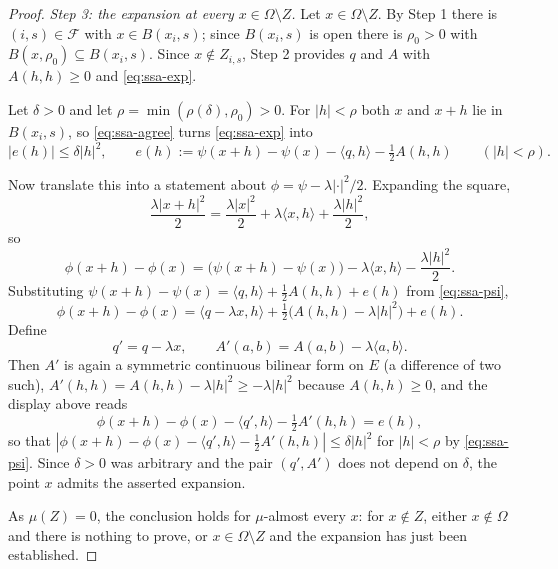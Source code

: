 \begin{proof}
\emph{Step 3: the expansion at every $x\in\Omega\setminus Z$.}
Let $x\in\Omega\setminus Z$. By Step 1 there is $(i,s)\in\mathcal F$ with
$x\in B(x_i,s)$; since $B(x_i,s)$ is open there is $\rho_0>0$ with
$B(x,\rho_0)\subseteq B(x_i,s)$. Since $x\notin Z_{i,s}$, Step 2 provides $q$ and
$A$ with $A(h,h)\ge0$ and \eqref{eq:ssa-exp}.

Let $\delta>0$ and let $\rho=\min(\rho(\delta),\rho_0)>0$. For $|h|<\rho$ both
$x$ and $x+h$ lie in $B(x_i,s)$, so \eqref{eq:ssa-agree} turns
\eqref{eq:ssa-exp} into
\begin{equation}\label{eq:ssa-psi}
  \bigl|e(h)\bigr|\le\delta|h|^2,\qquad
  e(h):=\psi(x+h)-\psi(x)-\langle q,h\rangle-\tfrac12A(h,h)
  \qquad(|h|<\rho).
\end{equation}

Now translate this into a statement about $\phi=\psi-\lambda|\cdot|^2/2$.
Expanding the square,
\[
  \frac{\lambda|x+h|^2}{2}
   =\frac{\lambda|x|^2}{2}+\lambda\langle x,h\rangle+\frac{\lambda|h|^2}{2},
\]
so
\[
  \phi(x+h)-\phi(x)
   =\bigl(\psi(x+h)-\psi(x)\bigr)-\lambda\langle x,h\rangle
     -\frac{\lambda|h|^2}{2}.
\]
Substituting $\psi(x+h)-\psi(x)=\langle q,h\rangle+\tfrac12A(h,h)+e(h)$ from
\eqref{eq:ssa-psi},
\[
  \phi(x+h)-\phi(x)
   =\langle q-\lambda x,h\rangle
    +\tfrac12\bigl(A(h,h)-\lambda|h|^2\bigr)+e(h).
\]
Define
\[
  q'=q-\lambda x,\qquad A'(a,b)=A(a,b)-\lambda\langle a,b\rangle .
\]
Then $A'$ is again a symmetric continuous bilinear form on $E$ (a difference of
two such), $A'(h,h)=A(h,h)-\lambda|h|^2\ge-\lambda|h|^2$ because $A(h,h)\ge0$,
and the display above reads
\[
  \phi(x+h)-\phi(x)-\langle q',h\rangle-\tfrac12A'(h,h)=e(h),
\]
so that $|\phi(x+h)-\phi(x)-\langle q',h\rangle-\tfrac12A'(h,h)|\le\delta|h|^2$
for $|h|<\rho$ by \eqref{eq:ssa-psi}. Since $\delta>0$ was arbitrary and the
pair $(q',A')$ does not depend on $\delta$, the point $x$ admits the asserted
expansion.

As $\mu(Z)=0$, the conclusion holds for $\mu$-almost every $x$: for
$x\notin Z$, either $x\notin\Omega$ and there is nothing to prove, or
$x\in\Omega\setminus Z$ and the expansion has just been established.
\end{proof}
